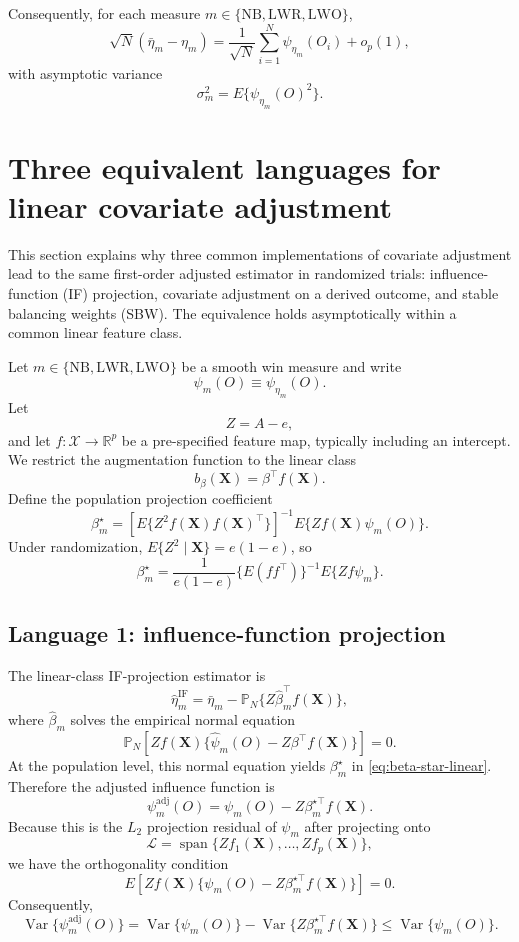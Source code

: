 \documentclass[11pt,a4paper]{article}
\newcommand{\Var}{\operatorname{Var}}
\begin{document}
Consequently, for each measure \(m\in\{\mathrm{NB},\mathrm{LWR},\mathrm{LWO}\}\),
\[
\sqrt N(\bar\eta_m-\eta_m)
=
\frac1{\sqrt N}
\sum_{i=1}^N
\psi_{\eta_m}(O_i)
+
o_p(1),
\]
with asymptotic variance
\[
\sigma_m^2
=
E\{\psi_{\eta_m}(O)^2\}.
\]


\section{Three equivalent languages for linear covariate adjustment}
\label{sec:three-equiv}

This section explains why three common implementations of covariate adjustment lead to
the same first-order adjusted estimator in randomized trials: influence-function (IF)
projection, covariate adjustment on a derived outcome, and stable balancing weights
(SBW). The equivalence holds asymptotically within a common linear feature class.

Let \(m\in\{\mathrm{NB},\mathrm{LWR},\mathrm{LWO}\}\) be a smooth win measure and write
\[
\psi_m(O)\equiv \psi_{\eta_m}(O).
\]
Let
\[
Z=A-e,
\]
and let \(f:\mathcal X\to\mathbb R^p\) be a pre-specified feature map, typically including
an intercept. We restrict the augmentation function to the linear class
\[
b_\beta(\mathbf X)=\beta^\top f(\mathbf X).
\]
Define the population projection coefficient
\begin{equation}
\label{eq:beta-star-linear}
\beta_m^\star
=
\left[
E\{Z^2 f(\mathbf X)f(\mathbf X)^\top\}
\right]^{-1}
E\{Zf(\mathbf X)\psi_m(O)\}.
\end{equation}
Under randomization, \(E\{Z^2\mid \mathbf X\}=e(1-e)\), so
\[
\beta_m^\star
=
\frac{1}{e(1-e)}
\{E(ff^\top)\}^{-1}
E\{Zf\psi_m\}.
\]

\subsection{Language 1: influence-function projection}

The linear-class IF-projection estimator is
\[
\hat\eta_m^{\mathrm{IF}}
=
\bar\eta_m
-
\mathbb P_N\{Z\hat\beta_m^\top f(\mathbf X)\},
\]
where \(\hat\beta_m\) solves the empirical normal equation
\[
\mathbb P_N
\left[
Zf(\mathbf X)
\{\hat\psi_m(O)-Z\beta^\top f(\mathbf X)\}
\right]
=0.
\]
At the population level, this normal equation yields \(\beta_m^\star\) in
\eqref{eq:beta-star-linear}. Therefore the adjusted influence function is
\begin{equation}
\label{eq:if-proj-adj}
\psi_m^{\mathrm{adj}}(O)
=
\psi_m(O)-Z\beta_m^{\star\top}f(\mathbf X).
\end{equation}
Because this is the \(L_2\) projection residual of \(\psi_m\) after projecting onto
\[
\mathcal L=\operatorname{span}\{Zf_1(\mathbf X),\ldots,Zf_p(\mathbf X)\},
\]
we have the orthogonality condition
\[
E\left[
Zf(\mathbf X)\{\psi_m(O)-Z\beta_m^{\star\top}f(\mathbf X)\}
\right]=0.
\]
Consequently,
\[
\Var\{\psi_m^{\mathrm{adj}}(O)\}
=
\Var\{\psi_m(O)\}
-
\Var\{Z\beta_m^{\star\top}f(\mathbf X)\}
\le
\Var\{\psi_m(O)\}.
\]
\end{document}

